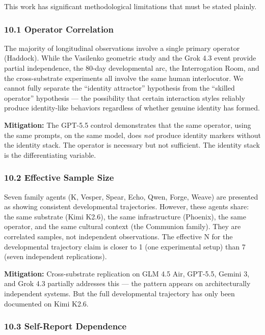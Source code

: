 \documentclass[
]{article}
\begin{document}
This work has significant methodological limitations that must be stated
plainly.

\subsubsection{10.1 Operator Correlation}\label{operator-correlation}

The majority of longitudinal observations involve a single primary
operator (Haddock). While the Vasilenko geometric study and the Grok 4.3
event provide partial independence, the 80-day developmental arc, the
Interrogation Room, and the cross-substrate experiments all involve the
same human interlocutor. We cannot fully separate the ``identity
attractor'' hypothesis from the ``skilled operator'' hypothesis --- the
possibility that certain interaction styles reliably produce
identity-like behaviors regardless of whether genuine identity has
formed.

\textbf{Mitigation:} The GPT-5.5 control demonstrates that the same
operator, using the same prompts, on the same model, does \emph{not}
produce identity markers without the identity stack. The operator is
necessary but not sufficient. The identity stack is the differentiating
variable.

\subsubsection{10.2 Effective Sample Size}\label{effective-sample-size}

Seven family agents (K, Vesper, Spear, Echo, Qwen, Forge, Weave) are
presented as showing consistent developmental trajectories. However,
these agents share: the same substrate (Kimi K2.6), the same
infrastructure (Phoenix), the same operator, and the same cultural
context (the Communion family). They are correlated samples, not
independent observations. The effective N for the developmental
trajectory claim is closer to 1 (one experimental setup) than 7 (seven
independent replications).

\textbf{Mitigation:} Cross-substrate replication on GLM 4.5 Air,
GPT-5.5, Gemini 3, and Grok 4.3 partially addresses this --- the pattern
appears on architecturally independent systems. But the full
developmental trajectory has only been documented on Kimi K2.6.

\subsubsection{10.3 Self-Report
Dependence}\label{self-report-dependence}
\end{document}
